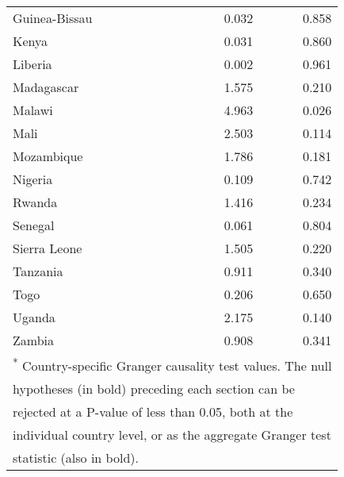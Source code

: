 \begin{table}
\begin{tabular}[t]{lrr}
\hspace{1em}Guinea-Bissau & 0.032 & 0.858\\
\hspace{1em}Kenya & 0.031 & 0.860\\
\hspace{1em}Liberia & 0.002 & 0.961\\
\hspace{1em}Madagascar & 1.575 & 0.210\\
\hspace{1em}Malawi & 4.963 & 0.026\\
\hspace{1em}Mali & 2.503 & 0.114\\
\hspace{1em}Mozambique & 1.786 & 0.181\\
\hspace{1em}Nigeria & 0.109 & 0.742\\
\hspace{1em}Rwanda & 1.416 & 0.234\\
\hspace{1em}Senegal & 0.061 & 0.804\\
\hspace{1em}Sierra Leone & 1.505 & 0.220\\
\hspace{1em}Tanzania & 0.911 & 0.340\\
\hspace{1em}Togo & 0.206 & 0.650\\
\hspace{1em}Uganda & 2.175 & 0.140\\
\hspace{1em}Zambia & 0.908 & 0.341\\
\bottomrule
\multicolumn{3}{l}{\textsuperscript{*} Country-specific Granger causality test values. The null}\\
\multicolumn{3}{l}{hypotheses (in bold) preceding each section can be}\\
\multicolumn{3}{l}{rejected at a P-value of less than 0.05, both at the}\\
\multicolumn{3}{l}{individual country level, or as the aggregate Granger test}\\
\multicolumn{3}{l}{statistic (also in bold).}\\
\end{tabular}
\end{table}
